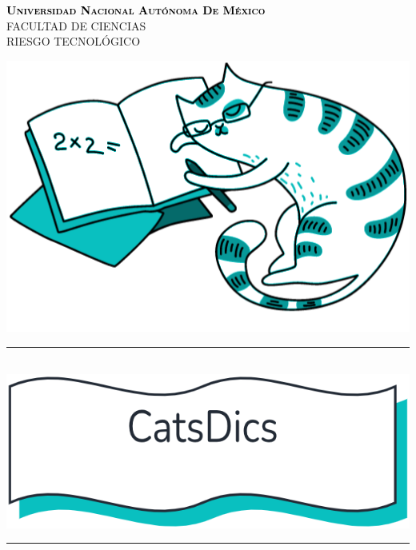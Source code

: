 \documentclass[12pt]{article}
\begin{document}
\begin{titlepage}
\begin{center}

\textsc{\Large \textcolor{black}{\textbf{Universidad Nacional Autónoma De México}}}\\[0.4cm]	

{\huge \Large \uppercase{Facultad de Ciencias} \\[0.4cm] }
{\huge \Large \uppercase{Riesgo Tecnológico} \\[1cm] }

\includegraphics[scale=0.45]{IMAGE/Logo.png}\\[1cm]


\rule{\linewidth}{0.7mm} \\[0.4cm]
\includegraphics[scale=0.45]{IMAGE/Empresa.png}\\[0.1cm]
\rule{\linewidth}{0.7mm} \\[1cm]


\\[0.4cm]


\end{center}
\end{titlepage}
\end{document}
